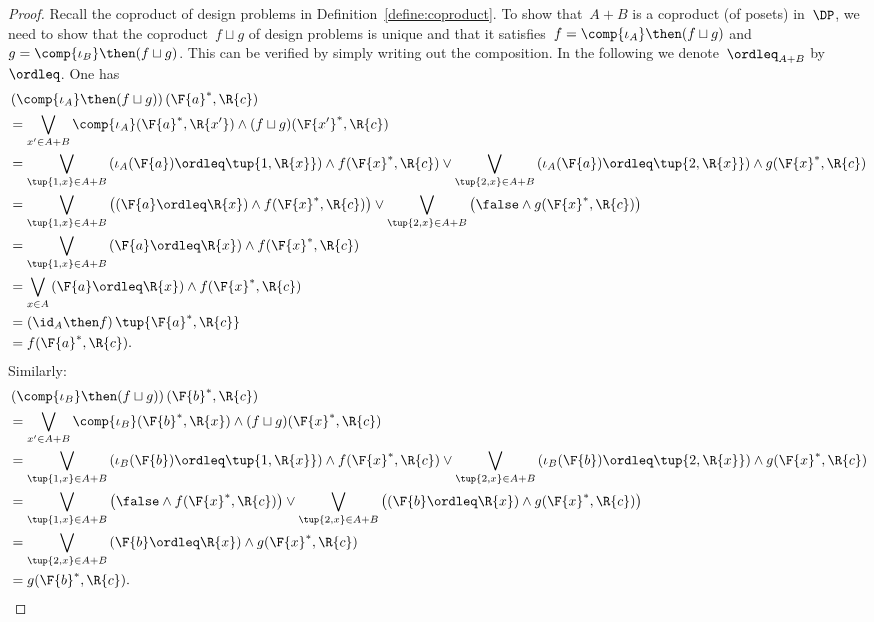 \begin{proof}
Recall the coproduct of design problems in Definition~\ref{define:coproduct}. To show that~$A+B$ is a coproduct (of posets) in~$\DP$, we need to show that the coproduct~$f \sqcup g$ of design problems is unique and that it satisfies~$f = \comp{\iota_A} \then (f \sqcup g)$ and~$g = \comp{\iota_B} \then (f \sqcup g)$. This can be verified by simply writing out the composition. In the following we denote~$\ordleq_{A+B}$ by $\ordleq$. One has
\begin{equation}
    \begin{aligned}
    &\left(\comp{\iota_A}\then (f\sqcup g)\right)(\F{a}^*,\R{c})\\&=\bigvee_{x' \in A+B}\comp{\iota_A}(\F{a}^*,\R{x'})\wedge (f\sqcup g)(\F{x'}^*,\R{c})\\
    &=\bigvee_{\tup{1,x} \in A+B}
    \left(\iota_A(\F{a})\ordleq\tup{1,\R{x}}\right)\wedge  f(\F{x}^*,\R{c})  \vee \bigvee_{\tup{2,x} \in A+B}
    \left(\iota_A(\F{a})\ordleq \tup{2,\R{x}}\right)\wedge  g(\F{x}^*,\R{c})\\
    &=\bigvee_{\tup{1,x} \in A+B}
    \left( \left(\F{a}\ordleq \R{x}\right) \wedge  f(\F{x}^*,\R{c})\right) \vee \bigvee_{\tup{2,x} \in A+B}
    \left( \false \wedge  g(\F{x}^*,\R{c}) \right)\\
    &=\bigvee_{\tup{1,x} \in A+B} \left(\F{a}\ordleq \R{x}\right) \wedge  f(\F{x}^*,\R{c})\\
    &=\bigvee_{x\in A}\left( \F{a}\ordleq \R{x}\right) \wedge f(\F{x}^*,\R{c})\\
    &=\left( \id_A \then f\right)\tup{\F{a}^*,\R{c}}\\
    &=f(\F{a}^*,\R{c}).
    \end{aligned}
\end{equation}
Similarly:
\begin{equation}
    \begin{aligned}
    &\left(\comp{\iota_B}\then (f\sqcup g)\right)(\F{b}^*,\R{c})\\&=\bigvee_{x' \in A+B}\comp{\iota_B}(\F{b}^*,\R{x})\wedge (f\sqcup g)(\F{x}^*,\R{c})\\
    &=\bigvee_{\tup{1,x} \in A+B}
    \left(\iota_B(\F{b})\ordleq\tup{1,\R{x}}\right)\wedge  f(\F{x}^*,\R{c})  \vee \bigvee_{\tup{2,x} \in A+B}
    \left(\iota_B(\F{b})\ordleq \tup{2,\R{x}}\right)\wedge  g(\F{x}^*,\R{c})\\
    &=\bigvee_{\tup{1,x} \in A+B}
    \left(\false \wedge  f(\F{x}^*,\R{c})\right) \vee \bigvee_{\tup{2,x} \in A+B}
    \left(\left(\F{b}\ordleq \R{x}\right) \wedge  g(\F{x}^*,\R{c}) \right)\\
    &=\bigvee_{\tup{2,x} \in A+B} \left(\F{b}\ordleq \R{x}\right) \wedge  g(\F{x}^*,\R{c})\\
    &=g(\F{b}^*,\R{c}).
    \end{aligned}
\end{equation}


\end{proof}
